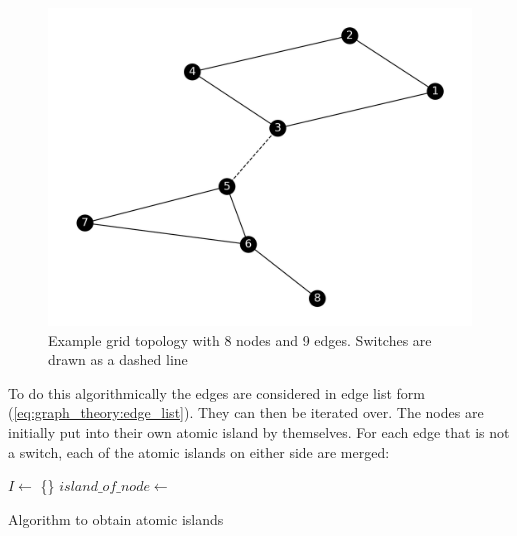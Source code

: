 \begin{figure}[H]
    \begin{center}
        \includegraphics[width=.7\linewidth]{img/atomic_island.png}
    \end{center}
    \caption{
        Example grid topology with 8 nodes and 9 edges. Switches
        are drawn as a dashed line
    }
    \label{fig:data_prep:atomic_islands}
\end{figure}

To do this algorithmically the edges are considered in edge list
form (\ref{eq:graph_theory:edge_list}). They can then be iterated over.
The nodes are initially put into their own atomic island by themselves.
For each edge that is not a switch, each of the atomic islands on either
side are merged:


\begin{algorithm}[h!]


    $I \gets $ \{\}\;
    $island\_of\_node \gets $ \New \Dict{}\;


    
    \caption{Algorithm to obtain atomic islands}
    \label{alg:data_prep:atomic_islands}
\end{algorithm}


